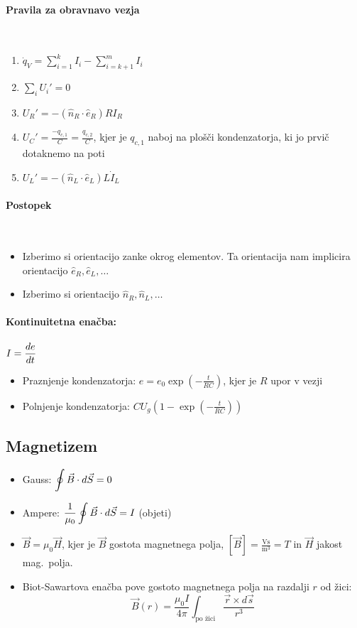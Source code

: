 \paragraph{Pravila za obravnavo vezja} \ 
\begin{enumerate}
    \item \(\dot{q}_V = \sum_{i=1}^{k}I_i - \sum_{i=k+1}^{m}I_i\)
    \item \(\sum_{i} U_i{'} = 0\)
    \item \(U_R' = - (\hat{n}_R \cdot \hat{e}_R) RI_R\)
    \item \(U_C' = \frac{-q_{c,1}}{C} = \frac{q_{c,2}}{C}\), kjer je \(q_{c, 1}\) naboj na plošči kondenzatorja, ki jo prvič dotaknemo na poti
    \item \(U_L' = - (\hat{n}_L \cdot \hat{e}_L) L \dot{I}_L\)
\end{enumerate}
\paragraph{Postopek} \
\begin{itemize}
    \item Izberimo si orientacijo zanke okrog elementov. Ta orientacija nam implicira orientacijo \(\hat{e}_R, \hat{e}_L, \ldots\)
    \item Izberimo si orientacijo \(\hat{n}_R, \hat{n}_L, \ldots\)
\end{itemize}
\paragraph{Kontinuitetna enačba:} \(\displaystyle I = \frac{de}{dt}\)
\begin{itemize}
    \item Praznjenje kondenzatorja: \(e = e_0 \exp(-\frac{t}{RC})\), kjer je \(R\) upor v vezji
    \item Polnjenje kondenzatorja: \(CU_g (1 - \exp(-\frac{t}{RC}))\)
\end{itemize}

\subsection{Magnetizem}
\begin{itemize}
    \item Gauss: \(\displaystyle \oint \vec{B} \cdot d \vec{S} = 0\)
    \item Ampere: \(\displaystyle \frac{1}{\mu_0} \oint \vec{B} \cdot d \vec{S} = I\) (objeti)
    \item \(\vec{B} = \mu_0 \vec{H}\), kjer je \(\vec{B}\) gostota magnetnega polja, \([\vec{B}] = \frac{\text{Vs}}{\text{m}^3} = T\) in \(\vec{H}\) jakost mag.\ polja.
    \item Biot-Sawartova enačba pove gostoto magnetnega polja na razdalji \(r\) od žici:
    \[\vec{B}(r) = \frac{\mu_0 I}{4 \pi} \int_{\text{po žici}} \frac{\vec{r} \times d \vec{s}}{r^3}\]
\end{itemize}